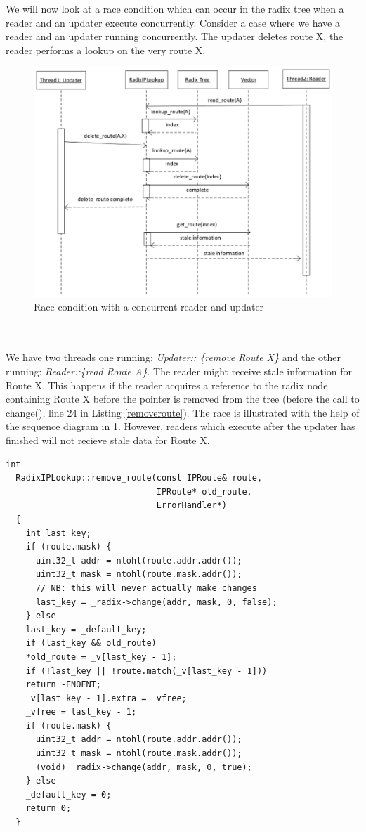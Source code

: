 \documentclass[a4paper,marginparwidth=50pt,marginparsep=10pt]{article}
\begin{document}
We will now look at a race condition which can occur in the radix tree when a reader and an updater execute concurrently. Consider a case where we have a reader and an updater running concurrently. The updater deletes route X, the reader performs a lookup on the very route X.
\begin{figure}[tph]
\begin{center}
\includegraphics[scale=0.6]{../images/diagrams/race1eps.eps}
\end{center}
\caption{Race condition with a concurrent reader and updater}
\label{race1figure}
\end{figure}
\\\\
We have two threads one running: \emph{Updater:: \{remove Route X\}} and the other running: \emph{Reader::\{read Route A\}}. The reader might receive stale information for Route X. This happens if the reader acquires a reference to the radix node containing Route X before the pointer is removed from the tree (before the call to change(), line 24 in Listing \ref{removeroute}). The race is illustrated with the help of the sequence diagram in \ref{race1figure}. However, readers which execute after the updater has finished will not recieve stale data for Route X.
\begin{lstlisting}[caption= The remove\_route() function, label=removeroute,float=tph]
  int
  RadixIPLookup::remove_route(const IPRoute& route, 
                              IPRoute* old_route, 
                              ErrorHandler*)
  {
    int last_key;
    if (route.mask) {
      uint32_t addr = ntohl(route.addr.addr());
      uint32_t mask = ntohl(route.mask.addr());
      // NB: this will never actually make changes
      last_key = _radix->change(addr, mask, 0, false);
    } else
    last_key = _default_key;
    if (last_key && old_route)
    *old_route = _v[last_key - 1];
    if (!last_key || !route.match(_v[last_key - 1]))
    return -ENOENT;
    _v[last_key - 1].extra = _vfree;
    _vfree = last_key - 1;
    if (route.mask) {
      uint32_t addr = ntohl(route.addr.addr());
      uint32_t mask = ntohl(route.mask.addr());
      (void) _radix->change(addr, mask, 0, true);
    } else
    _default_key = 0;
    return 0;
  }
\end{lstlisting}
\end{document}
